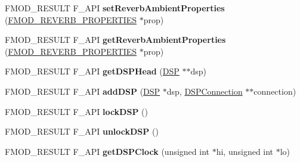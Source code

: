 \begin{DoxyCompactItemize}
\item 
\hypertarget{class_f_m_o_d_1_1_system_a17893e303c0ffb6c9c4693a53e2db288}{F\-M\-O\-D\-\_\-\-R\-E\-S\-U\-L\-T F\-\_\-\-A\-P\-I {\bfseries set\-Reverb\-Ambient\-Properties} (\hyperlink{struct_f_m_o_d___r_e_v_e_r_b___p_r_o_p_e_r_t_i_e_s}{F\-M\-O\-D\-\_\-\-R\-E\-V\-E\-R\-B\-\_\-\-P\-R\-O\-P\-E\-R\-T\-I\-E\-S} $\ast$prop)}\label{class_f_m_o_d_1_1_system_a17893e303c0ffb6c9c4693a53e2db288}

\item 
\hypertarget{class_f_m_o_d_1_1_system_a7bccc1c1c58f331bda60c4340d034790}{F\-M\-O\-D\-\_\-\-R\-E\-S\-U\-L\-T F\-\_\-\-A\-P\-I {\bfseries get\-Reverb\-Ambient\-Properties} (\hyperlink{struct_f_m_o_d___r_e_v_e_r_b___p_r_o_p_e_r_t_i_e_s}{F\-M\-O\-D\-\_\-\-R\-E\-V\-E\-R\-B\-\_\-\-P\-R\-O\-P\-E\-R\-T\-I\-E\-S} $\ast$prop)}\label{class_f_m_o_d_1_1_system_a7bccc1c1c58f331bda60c4340d034790}

\item 
\hypertarget{class_f_m_o_d_1_1_system_a9cf8e7677c30b2311e8be63f226ff725}{F\-M\-O\-D\-\_\-\-R\-E\-S\-U\-L\-T F\-\_\-\-A\-P\-I {\bfseries get\-D\-S\-P\-Head} (\hyperlink{class_f_m_o_d_1_1_d_s_p}{D\-S\-P} $\ast$$\ast$dsp)}\label{class_f_m_o_d_1_1_system_a9cf8e7677c30b2311e8be63f226ff725}

\item 
\hypertarget{class_f_m_o_d_1_1_system_a906201eed9cae8c352b4f57393587a16}{F\-M\-O\-D\-\_\-\-R\-E\-S\-U\-L\-T F\-\_\-\-A\-P\-I {\bfseries add\-D\-S\-P} (\hyperlink{class_f_m_o_d_1_1_d_s_p}{D\-S\-P} $\ast$dsp, \hyperlink{class_f_m_o_d_1_1_d_s_p_connection}{D\-S\-P\-Connection} $\ast$$\ast$connection)}\label{class_f_m_o_d_1_1_system_a906201eed9cae8c352b4f57393587a16}

\item 
\hypertarget{class_f_m_o_d_1_1_system_a3e214796058609cdf622c8be675f43a9}{F\-M\-O\-D\-\_\-\-R\-E\-S\-U\-L\-T F\-\_\-\-A\-P\-I {\bfseries lock\-D\-S\-P} ()}\label{class_f_m_o_d_1_1_system_a3e214796058609cdf622c8be675f43a9}

\item 
\hypertarget{class_f_m_o_d_1_1_system_a2caf736a103467e81ff40a34e9702423}{F\-M\-O\-D\-\_\-\-R\-E\-S\-U\-L\-T F\-\_\-\-A\-P\-I {\bfseries unlock\-D\-S\-P} ()}\label{class_f_m_o_d_1_1_system_a2caf736a103467e81ff40a34e9702423}

\item 
\hypertarget{class_f_m_o_d_1_1_system_a459ae3b77f9da1ca9f1cb680b843b074}{F\-M\-O\-D\-\_\-\-R\-E\-S\-U\-L\-T F\-\_\-\-A\-P\-I {\bfseries get\-D\-S\-P\-Clock} (unsigned int $\ast$hi, unsigned int $\ast$lo)}\label{class_f_m_o_d_1_1_system_a459ae3b77f9da1ca9f1cb680b843b074}


\end{DoxyCompactItemize}
